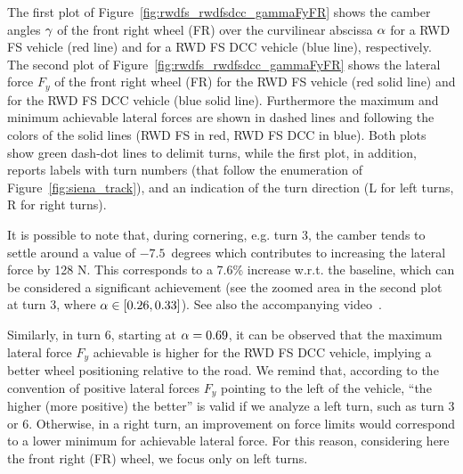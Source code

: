 The first plot of Figure~\ref{fig:rwdfs_rwdfsdcc_gammaFyFR} shows the camber angles $\gamma$ of the front right wheel (FR) over the curvilinear abscissa $\alpha$ for a RWD FS vehicle (red line) and for a RWD FS DCC vehicle (blue line), respectively.
The second plot of Figure~\ref{fig:rwdfs_rwdfsdcc_gammaFyFR} shows the lateral force $F_y$ of the front right wheel (FR) for the RWD FS vehicle (red solid line) and for the RWD FS DCC vehicle (blue solid line). Furthermore the maximum and minimum achievable lateral forces are shown in dashed lines and following the colors of the solid lines (RWD FS in red, RWD FS DCC in blue). Both plots show green dash-dot lines to delimit turns, while the first plot, in addition, reports labels with turn numbers (that follow the enumeration of Figure~\ref{fig:siena_track}), and an indication of the turn direction (L for left turns, R for right turns).

It is possible to note that, during cornering, e.g. turn 3, the camber tends to settle around a value of $-7.5$~degrees which contributes to increasing the lateral force by 128 N. This corresponds to a 7.6\% increase w.r.t. the baseline, which can be considered a significant achievement (see the zoomed area in the second plot at turn 3, where $\alpha\in [0.26, 0.33]$). See also the accompanying video~\cite{video:RWDFSDCC:2024}.

Similarly, in turn 6, starting at $\alpha = 0.69$, it can be observed that the maximum lateral force $F_y$ achievable is higher for the RWD FS DCC vehicle, implying a better wheel positioning relative to the road.
We remind that, according to the convention of positive lateral forces $F_y$ pointing to the left of the vehicle, ``the higher (more positive) the better'' is valid if we analyze a left turn, such as turn 3 or 6. Otherwise, in a right turn, an improvement on force limits would correspond to a lower minimum for achievable lateral force.
For this reason, considering here the front right (FR) wheel, we focus only on left turns.

